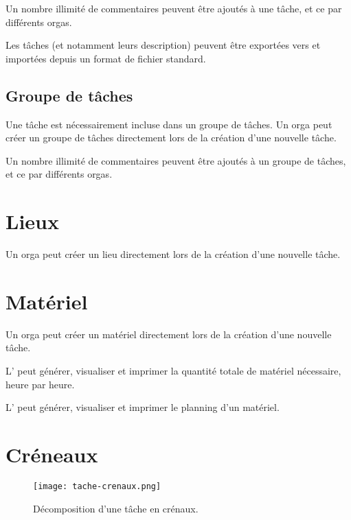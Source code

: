 Un nombre illimité de commentaires peuvent être ajoutés à une tâche, et ce par différents orgas.

Les tâches (et notamment leurs description) peuvent être exportées vers et importées depuis un format de fichier standard.


\subsection{Groupe de tâches}
Une tâche est nécessairement incluse dans un groupe de tâches.
Un orga peut créer un groupe de tâches directement lors de la création d'une nouvelle tâche.

Un nombre illimité de commentaires peuvent être ajoutés à un groupe de tâches, et ce par différents orgas.

\section{Lieux}
Un orga peut créer un lieu directement lors de la création d'une nouvelle tâche.



\section{Matériel}

Un orga peut créer un matériel directement lors de la création d'une nouvelle tâche.

L'\oh{} peut générer, visualiser et imprimer la quantité totale de matériel nécessaire, heure par heure.

L'\oh{} peut générer, visualiser et imprimer le planning d'un matériel.

\section{Créneaux}

\begin{figure}[h!t]
\centering
\texttt{[image: tache-crenaux.png]}

\caption{Décomposition d'une tâche en crénaux.}
\label{fig:crenaux}
\end{figure}



